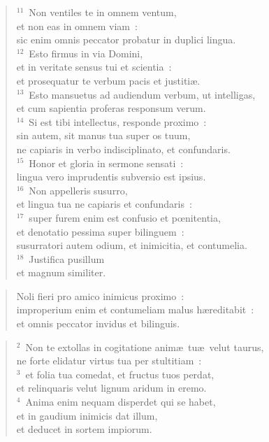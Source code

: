 \begin{flushleft}\begin{verse}${}^{11}$~Non ventiles te in omnem ventum,\\ et non eas in omnem viam~:\\ sic enim omnis peccator probatur in duplici lingua.\\
${}^{12}$~Esto firmus in via Domini,\\ et in veritate sensus tui et scientia~:\\ et prosequatur te verbum pacis et justiti\ae .\\
${}^{13}$~Esto mansuetus ad audiendum verbum, ut intelligas,\\ et cum sapientia proferas responsum verum.\\
${}^{14}$~Si est tibi intellectus, responde proximo~:\\ sin autem, sit manus tua super os tuum,\\ ne capiaris in verbo indisciplinato, et confundaris.\\
${}^{15}$~Honor et gloria in sermone sensati~:\\ lingua vero imprudentis subversio est ipsius.\\
${}^{16}$~Non appelleris susurro,\\ et lingua tua ne capiaris et confundaris~:\\
${}^{17}$~super furem enim est confusio et pœnitentia,\\ et denotatio pessima super bilinguem~:\\ susurratori autem odium, et inimicitia, et contumelia.\\
${}^{18}$~Justifica pusillum\\ et magnum similiter.\end{verse}\end{flushleft}


\begin{flushleft}\begin{verse}\vspace{-19pt}Noli fieri pro amico inimicus proximo~:\\ improperium enim et contumeliam malus h\ae reditabit~:\\ et omnis peccator invidus et bilinguis.\end{verse}\end{flushleft}


\begin{flushleft}\begin{verse}\vspace{6pt}${}^{2}$~Non te extollas in cogitatione anim\ae\ tu\ae\ velut taurus,\\ ne forte elidatur virtus tua per stultitiam~:\\
${}^{3}$~et folia tua comedat, et fructus tuos perdat,\\ et relinquaris velut lignum aridum in eremo.\\
${}^{4}$~Anima enim nequam disperdet qui se habet,\\ et in gaudium inimicis dat illum,\\ et deducet in sortem impiorum.\end{verse}\end{flushleft}


